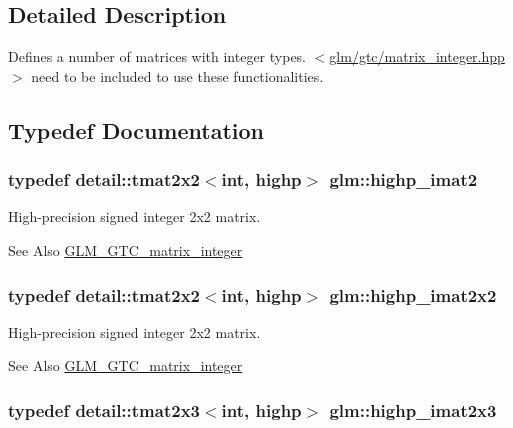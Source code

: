 \subsection{Detailed Description}
Defines a number of matrices with integer types. $<$\hyperlink{matrix__integer_8hpp}{glm/gtc/matrix\-\_\-integer.\-hpp}$>$ need to be included to use these functionalities. 

\subsection{Typedef Documentation}
\hypertarget{group__gtc__matrix__integer_ga70eae282157f23589db24f4664bbf956}{
\subsubsection[{highp\-\_\-imat2}]{\setlength{\rightskip}{0pt plus 5cm}typedef detail\-::tmat2x2$<$int, highp$>$ {\bf glm\-::highp\-\_\-imat2}}}\label{group__gtc__matrix__integer_ga70eae282157f23589db24f4664bbf956}
High-\/precision signed integer 2x2 matrix. \begin{DoxySeeAlso}{See Also}
\hyperlink{group__gtc__matrix__integer}{G\-L\-M\-\_\-\-G\-T\-C\-\_\-matrix\-\_\-integer} 
\end{DoxySeeAlso}
\hypertarget{group__gtc__matrix__integer_ga9646ff5ef973234755e63e727c5a37fc}{
\subsubsection[{highp\-\_\-imat2x2}]{\setlength{\rightskip}{0pt plus 5cm}typedef detail\-::tmat2x2$<$int, highp$>$ {\bf glm\-::highp\-\_\-imat2x2}}}\label{group__gtc__matrix__integer_ga9646ff5ef973234755e63e727c5a37fc}
High-\/precision signed integer 2x2 matrix. \begin{DoxySeeAlso}{See Also}
\hyperlink{group__gtc__matrix__integer}{G\-L\-M\-\_\-\-G\-T\-C\-\_\-matrix\-\_\-integer} 
\end{DoxySeeAlso}
\hypertarget{group__gtc__matrix__integer_ga7b7079ab95ac8f533ac565fcf1341c76}{
\subsubsection[{highp\-\_\-imat2x3}]{\setlength{\rightskip}{0pt plus 5cm}typedef detail\-::tmat2x3$<$int, highp$>$ {\bf glm\-::highp\-\_\-imat2x3}}}\label{group__gtc__matrix__integer_ga7b7079ab95ac8f533ac565fcf1341c76}
